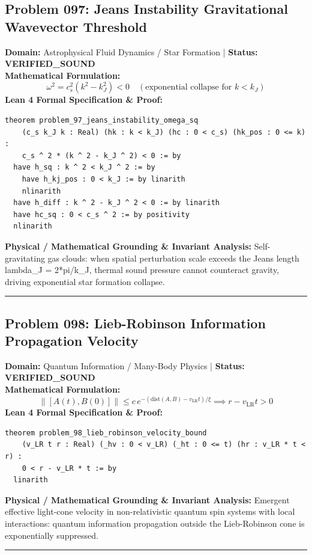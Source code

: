 \documentclass[10pt,a4paper]{article}
\begin{document}
\subsection*{Problem 097: Jeans Instability Gravitational Wavevector Threshold}
\textbf{Domain:} Astrophysical Fluid Dynamics / Star Formation \quad | \quad \textbf{Status:} \textcolor{green!70!black}{\textbf{VERIFIED\_SOUND}}\\
\textbf{Mathematical Formulation:}
\begin{equation*}
  \omega^2 = c_s^2 (k^2 - k_J^2) < 0 \quad (\text{exponential collapse for } k < k_J)
\end{equation*}
\textbf{Lean 4 Formal Specification \& Proof:}
\begin{lstlisting}
theorem problem_97_jeans_instability_omega_sq
    (c_s k_J k : Real) (hk : k < k_J) (hc : 0 < c_s) (hk_pos : 0 <= k) :
    c_s ^ 2 * (k ^ 2 - k_J ^ 2) < 0 := by
  have h_sq : k ^ 2 < k_J ^ 2 := by
    have h_kj_pos : 0 < k_J := by linarith
    nlinarith
  have h_diff : k ^ 2 - k_J ^ 2 < 0 := by linarith
  have hc_sq : 0 < c_s ^ 2 := by positivity
  nlinarith
\end{lstlisting}
\textbf{Physical / Mathematical Grounding \& Invariant Analysis:}
Self-gravitating gas clouds: when spatial perturbation scale exceeds the Jeans length lambda\_J = 2*pi/k\_J, thermal sound pressure cannot counteract gravity, driving exponential star formation collapse.
\vspace{0.8em}\hrule\vspace{0.8em}
\subsection*{Problem 098: Lieb-Robinson Information Propagation Velocity}
\textbf{Domain:} Quantum Information / Many-Body Physics \quad | \quad \textbf{Status:} \textcolor{green!70!black}{\textbf{VERIFIED\_SOUND}}\\
\textbf{Mathematical Formulation:}
\begin{equation*}
  \|[A(t), B(0)]\| \le c \, e^{-(\text{dist}(A, B) - v_{\text{LR}} t)/\xi} \implies r - v_{\text{LR}} t > 0
\end{equation*}
\textbf{Lean 4 Formal Specification \& Proof:}
\begin{lstlisting}
theorem problem_98_lieb_robinson_velocity_bound
    (v_LR t r : Real) (_hv : 0 < v_LR) (_ht : 0 <= t) (hr : v_LR * t < r) :
    0 < r - v_LR * t := by
  linarith
\end{lstlisting}
\textbf{Physical / Mathematical Grounding \& Invariant Analysis:}
Emergent effective light-cone velocity in non-relativistic quantum spin systems with local interactions: quantum information propagation outside the Lieb-Robinson cone is exponentially suppressed.
\vspace{0.8em}\hrule\vspace{0.8em}
\end{document}
